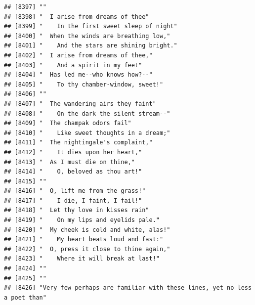 \documentclass{article}\usepackage[]{graphicx}\usepackage[]{color}
\makeatletter
\newenvironment{kframe}{%
 \def\at@end@of@kframe{}%
 \ifinner\ifhmode%
  \def\at@end@of@kframe{\end{minipage}}%
  \begin{minipage}{\columnwidth}%
 \fi\fi%
 \def\FrameCommand##1{\hskip\@totalleftmargin \hskip-\fboxsep
 \colorbox{shadecolor}{##1}\hskip-\fboxsep
     \hskip-\linewidth \hskip-\@totalleftmargin \hskip\columnwidth}%
 \MakeFramed {\advance\hsize-\width
   \@totalleftmargin\z@ \linewidth\hsize
   \@setminipage}}%
 {\par\unskip\endMakeFramed%
 \at@end@of@kframe}
\newenvironment{knitrout}{}{} %
\makeatother
\begin{document}
\begin{knitrout}
\begin{kframe}
\begin{verbatim}
## [8397] ""                                                                            
## [8398] "  I arise from dreams of thee"                                               
## [8399] "    In the first sweet sleep of night"                                       
## [8400] "  When the winds are breathing low,"                                         
## [8401] "    And the stars are shining bright."                                       
## [8402] "  I arise from dreams of thee,"                                              
## [8403] "    And a spirit in my feet"                                                 
## [8404] "  Has led me--who knows how?--"                                              
## [8405] "    To thy chamber-window, sweet!"                                           
## [8406] ""                                                                            
## [8407] "  The wandering airs they faint"                                             
## [8408] "    On the dark the silent stream--"                                         
## [8409] "  The champak odors fail"                                                    
## [8410] "    Like sweet thoughts in a dream;"                                         
## [8411] "  The nightingale's complaint,"                                              
## [8412] "    It dies upon her heart,"                                                 
## [8413] "  As I must die on thine,"                                                   
## [8414] "    O, beloved as thou art!"                                                 
## [8415] ""                                                                            
## [8416] "  O, lift me from the grass!"                                                
## [8417] "    I die, I faint, I fail!"                                                 
## [8418] "  Let thy love in kisses rain"                                               
## [8419] "    On my lips and eyelids pale."                                            
## [8420] "  My cheek is cold and white, alas!"                                         
## [8421] "    My heart beats loud and fast:"                                           
## [8422] "  O, press it close to thine again,"                                         
## [8423] "    Where it will break at last!"                                            
## [8424] ""                                                                            
## [8425] ""                                                                            
## [8426] "Very few perhaps are familiar with these lines, yet no less a poet than"     

\end{verbatim}
\end{kframe}
\end{knitrout}
\end{document}
